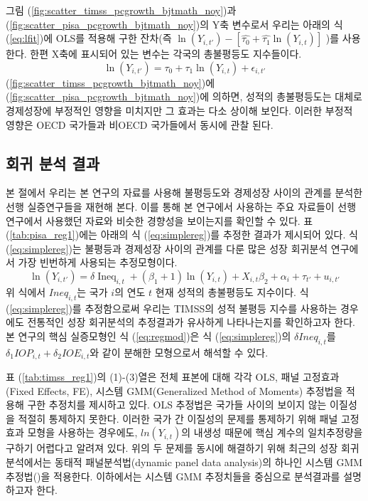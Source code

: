 그림 (\ref{fig:scatter_timss_pcgrowth_bjtmath_noy})과 (\ref{fig:scatter_pisa_pcgrowth_bjtmath_noy})의 Y축 변수로서 우리는 아래의 식 (\ref{eq:lfit})에 OLS를 적용해 구한 잔차(즉 $\ln \left(Y_{i, t'}\right)-\left[\widehat{\tau_{0}}+\widehat{\tau_{1}} \ln \left(Y_{i, t}\right)\right]$ )를 사용한다. 
한편 X축에 표시되어 있는 변수는 각국의 총불평등도 지수들이다.
\begin{equation}
\label{eq:lfit}
\ln \left(Y_{i, t'}\right)=\tau_{0}+\tau_{1} \ln \left(Y_{i, t}\right)+\epsilon_{i, t'}
\end{equation}
(\ref{fig:scatter_timss_pcgrowth_bjtmath_noy})에 (\ref{fig:scatter_pisa_pcgrowth_bjtmath_noy})에 의하면, 성적의 총불평등도는 대체로 경제성장에 부정적인 영향을 미치지만 그 효과는 다소 상이해 보인다.
이러한 부정적 영향은 OECD 국가들과 비OECD 국가들에서 동시에 관찰 된다.

\subsection{회귀 분석 결과}
본 절에서 우리는 본 연구의 자료를 사용해 불평등도와 경제성장 사이의 관계를 분석한 선행 실증연구들을 재현해 본다. 이를 통해 본 연구에서 사용하는 주요 자료들이 선행 연구에서 사용했던 자료와 비슷한 경향성을 보이는지를 확인할 수 있다.  표 (\ref{tab:pisa_reg1})에는 아래의 식 (\ref{eq:simplereg})를 추정한 결과가 제시되어 있다. 식 (\ref{eq:simplereg})는 불평등과 경제성장 사이의 관계를 다룬 많은 성장 회귀분석 연구에서 가장 빈번하게 사용되는 추정모형이다.
\begin{equation}
\label{eq:simplereg}
\ln \left(Y_{i, t'}\right)=\delta \operatorname{Ineq}_{i, t}+\left(\beta_{1}+1\right) \ln \left(Y_{i, t}\right)+X_{i, t} \beta_{2}+\alpha_{i}+\tau_{t'}+u_{i, t'}
\end{equation}
위 식에서 $Ineq_{i,t}$는 국가 $i$의 연도 $t$ 현재 성적의 총불평등도 지수이다. 식 (\ref{eq:simplereg})를 추정함으로써 우리는 TIMSS의 성적 불평등 지수를 사용하는 경우에도 전통적인 성장 회귀분석의 추정결과가 유사하게 나타나는지를 확인하고자 한다. 본 연구의 핵심 실증모형인 식 (\ref{eq:regmod})은 식 (\ref{eq:simplereg})의 $\delta Ineq_{i,t}$를 $\delta_{1} I O P_{i, t}+\delta_{2} I O E_{i, t}$와 같이 분해한 모형으로서 해석할 수 있다.
 
표 (\ref{tab:timss_reg1})의 (1)-(3)열은 전체 표본에 대해 각각 OLS, 패널 고정효과(Fixed Effects, FE), 시스템 GMM(Generalized Method of Moments) 추정법을 적용해 구한 추정치를 제시하고 있다.
OLS 추정법은 국가들 사이의 보이지 않는 이질성을 적절히 통제하지 못한다.
 이러한 국가 간 이질성의 문제를 통제하기 위해 패널 고정효과 모형을 사용하는 경우에도, $ln(Y_{i,t})$의 내생성 때문에 핵심 계수의 일치추정량을 구하기 어렵다고 알려져 있다.
위의 두 문제를 동시에 해결하기 위해 최근의 성장 회귀분석에서는 동태적 패널분석법(dynamic panel data analysis)의 하나인 시스템 GMM 추정법(\citet{bnb98})을 적용한다.
이하에서는 시스템 GMM 추정치들을 중심으로 분석결과를 설명하고자 한다.

